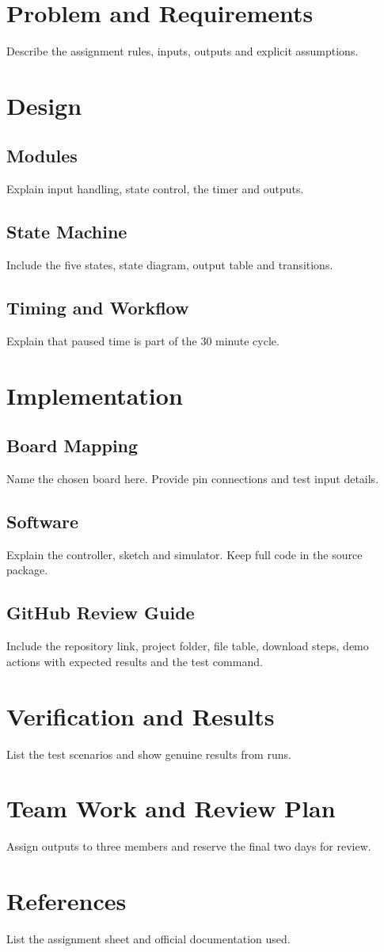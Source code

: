\documentclass[11pt,a4paper]{article}
\begin{document}

\tableofcontents
\clearpage
\section{Problem and Requirements}
Describe the assignment rules, inputs, outputs and explicit assumptions.
\section{Design}
\subsection{Modules}
Explain input handling, state control, the timer and outputs.
\subsection{State Machine}
Include the five states, state diagram, output table and transitions.
\subsection{Timing and Workflow}
Explain that paused time is part of the 30 minute cycle.
\section{Implementation}
\subsection{Board Mapping}
Name the chosen board here. Provide pin connections and test input details.
\subsection{Software}
Explain the controller, sketch and simulator. Keep full code in the source package.
\subsection{GitHub Review Guide}
Include the repository link, project folder, file table, download steps,
demo actions with expected results and the test command.
\section{Verification and Results}
List the test scenarios and show genuine results from runs.
\section{Team Work and Review Plan}
Assign outputs to three members and reserve the final two days for review.
\section*{References}
List the assignment sheet and official documentation used.
\end{document}
